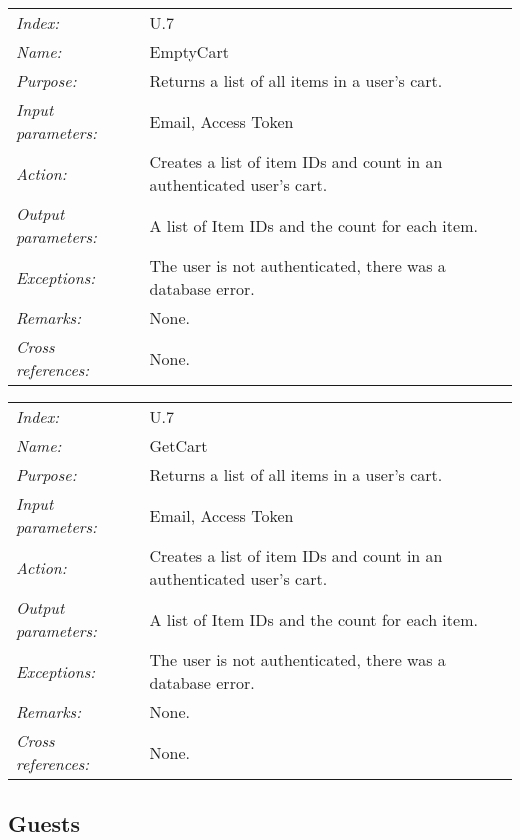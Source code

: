 \documentclass[10pt,letter]{article}
\begin{document}
\begin{tabularx}{\textwidth}{l X}
    \it{Index:} & U.7 \\
    \it{Name:} & EmptyCart \\
    \it{Purpose:} & Returns a list of all items in a user's cart. \\
    \it{Input parameters:} & Email, Access Token \\
    \it{Action:} & Creates a list of item IDs and count in an authenticated user's cart. \\
    \it{Output parameters:} & A list of Item IDs and the count for each item. \\
    \it{Exceptions:} & The user is not authenticated, there was a database error. \\
    \it{Remarks:} & None. \\
    \it{Cross references:} & None. \\
    \hline
\end{tabularx}


\begin{tabularx}{\textwidth}{l X}
    \it{Index:} & U.7 \\
    \it{Name:} & GetCart \\
    \it{Purpose:} & Returns a list of all items in a user's cart. \\
    \it{Input parameters:} & Email, Access Token \\
    \it{Action:} & Creates a list of item IDs and count in an authenticated user's cart. \\
    \it{Output parameters:} & A list of Item IDs and the count for each item. \\
    \it{Exceptions:} & The user is not authenticated, there was a database error. \\
    \it{Remarks:} & None. \\
    \it{Cross references:} & None. \\
    \hline
\end{tabularx}

\subsection{Guests}
\end{document}
